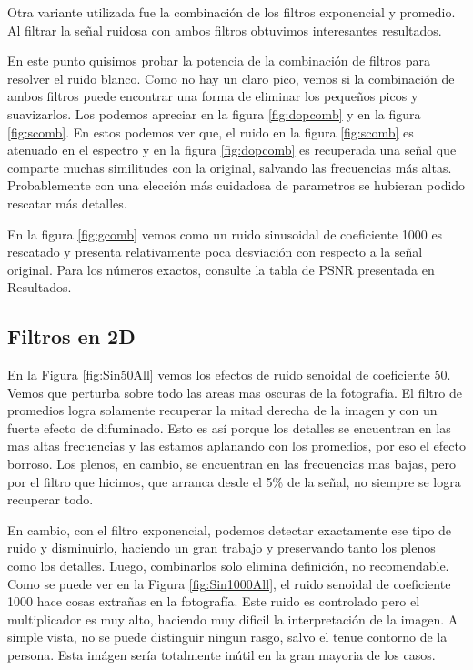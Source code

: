 Otra variante utilizada fue la combinaci\'on de los filtros exponencial y
promedio. Al filtrar la se\~nal ruidosa con ambos filtros obtuvimos interesantes
resultados.

En este punto quisimos probar la potencia de la combinaci\'on de filtros para resolver
el ruido blanco. Como no hay un claro pico, vemos si la combinaci\'on de ambos
filtros puede encontrar una forma de eliminar los peque\~nos picos y suavizarlos.
Los podemos apreciar en la figura \ref{fig:dopcomb} y en la figura \ref{fig:scomb}.
En estos podemos ver que, el ruido en la figura \ref{fig:scomb} es atenuado
en el espectro y en la figura \ref{fig:dopcomb} es recuperada una se\~nal que
comparte muchas similitudes con la original, salvando las frecuencias
m\'as altas. Probablemente con una elecci\'on m\'as cuidadosa de parametros
se hubieran podido rescatar m\'as detalles.

En la figura \ref{fig:gcomb} vemos como un ruido sinusoidal de coeficiente 1000
es rescatado y presenta relativamente poca desviaci\'on con respecto
a la se\~nal original. Para los n\'umeros exactos, consulte la tabla de
PSNR presentada en Resultados.

\subsection{Filtros en 2D}


En la Figura \ref{fig:Sin50All} vemos los efectos de ruido senoidal
de coeficiente 50. Vemos que perturba sobre todo las areas mas oscuras
de la fotograf\'ia. El filtro de promedios logra solamente recuperar la mitad
derecha de la imagen y con un fuerte efecto de difuminado.
Esto es as\'i porque los detalles se encuentran en las mas altas frecuencias
y las estamos aplanando con los promedios, por eso el efecto borroso.
Los plenos, en cambio, se encuentran en las frecuencias mas bajas, pero
por el filtro que hicimos, que arranca desde el 5\% de la señal,
no siempre se logra recuperar todo.

En cambio, con el filtro exponencial, podemos detectar exactamente ese
tipo de ruido y disminuirlo, haciendo un gran trabajo y preservando tanto
los plenos como los detalles. Luego, combinarlos solo elimina definici\'on,
no recomendable.\\


Como se puede ver en la Figura \ref{fig:Sin1000All}, el ruido senoidal
de coeficiente 1000 hace cosas extrañas en la fotograf\'ia.
Este ruido es controlado pero el multiplicador es muy alto, haciendo muy 
dificil la interpretaci\'on de la imagen. A simple vista, no se puede distinguir ningun rasgo,
salvo el tenue contorno de la persona.
Esta im\'agen ser\'ia totalmente in\'util en la gran mayoria de los casos.

